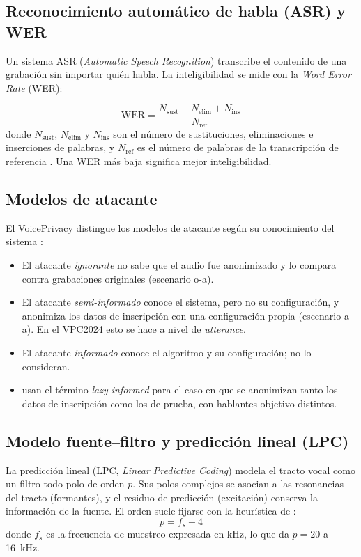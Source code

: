 \subsection{Reconocimiento automático de habla (ASR) y WER}
Un sistema ASR (\textit{Automatic Speech Recognition}) transcribe 
el contenido de una grabación sin importar quién habla. La inteligibilidad 
se mide con la \textit{Word Error Rate} (WER):

\begin{equation}
  \mathrm{WER} = \frac{N_{\mathrm{sust}} + N_{\mathrm{elim}} + N_{\mathrm{ins}}}{N_{\mathrm{ref}}}
  \label{eq:wer}
\end{equation}
donde $N_{\mathrm{sust}}$, $N_{\mathrm{elim}}$ y $N_{\mathrm{ins}}$ 
son el número de sustituciones, eliminaciones e inserciones de palabras, 
y $N_{\mathrm{ref}}$ es el número de palabras de la transcripción de 
referencia \parencite{deng2023}. Una WER más baja significa mejor inteligibilidad.

\subsection{Modelos de atacante}
El VoicePrivacy distingue los modelos de atacante según su conocimiento del sistema 
\parencite{patino2021,tomashenko2024}:
\begin{itemize}
  \item El atacante \textit{ignorante} no sabe que el audio fue anonimizado 
  y lo compara contra grabaciones originales (escenario o-a).

  \item El atacante \textit{semi-informado} conoce el sistema, pero no su 
  configuración, y anonimiza los datos de inscripción con una configuración 
  propia (escenario a-a). En el VPC2024 esto se hace a nivel de \textit{utterance}.

  \item El atacante \textit{informado} conoce el algoritmo y su configuración; 
  \textcite{patino2021} no lo consideran.

  \item \textcite{quamer2024} usan el término \textit{lazy-informed} para el 
  caso en que se anonimizan tanto los datos de inscripción como los de prueba, 
  con hablantes objetivo distintos.
\end{itemize}

\subsection{Modelo fuente--filtro y predicción lineal (LPC)}
La predicción lineal (LPC, \textit{Linear Predictive Coding}) modela el tracto vocal 
como un filtro todo-polo de orden $p$. Sus polos complejos se asocian a las resonancias 
del tracto (formantes), y el residuo de predicción (excitación) conserva la información 
de la fuente. El orden suele fijarse con la heurística de \textcite{markel1976linear}:
\begin{equation}
  p = f_s + 4
  \label{eq:lpc-order}
\end{equation}
donde $f_s$ es la frecuencia de muestreo expresada en kHz, lo que da $p = 20$ a 16~kHz. 


